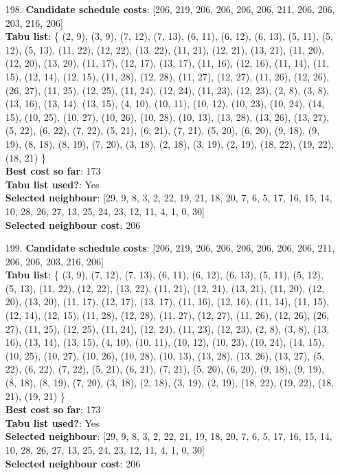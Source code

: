 \documentclass[fleqn]{article}
\begin{document}
\begin{itemize}
    \item[198.] \textbf{Candidate schedule costs}: [206, 219, 206, 206, 206, 206, 211, 206, 206, 203, 216, 206] \\
    \textbf{Tabu list}: \{ (2, 9), (3, 9), (7, 12), (7, 13), (6, 11), (6, 12), (6, 13), (5, 11), (5, 12), (5, 13), (11, 22), (12, 22), (13, 22), (11, 21), (12, 21), (13, 21), (11, 20), (12, 20), (13, 20), (11, 17), (12, 17), (13, 17), (11, 16), (12, 16), (11, 14), (11, 15), (12, 14), (12, 15), (11, 28), (12, 28), (11, 27), (12, 27), (11, 26), (12, 26), (26, 27), (11, 25), (12, 25), (11, 24), (12, 24), (11, 23), (12, 23), (2, 8), (3, 8), (13, 16), (13, 14), (13, 15), (4, 10), (10, 11), (10, 12), (10, 23), (10, 24), (14, 15), (10, 25), (10, 27), (10, 26), (10, 28), (10, 13), (13, 28), (13, 26), (13, 27), (5, 22), (6, 22), (7, 22), (5, 21), (6, 21), (7, 21), (5, 20), (6, 20), (9, 18), (9, 19), (8, 18), (8, 19), (7, 20), (3, 18), (2, 18), (3, 19), (2, 19), (18, 22), (19, 22), (18, 21) \} \\
    \textbf{Best cost so far}: 173 \\
    \textbf{Tabu list used?}: Yes \\
    \textbf{Selected neighbour}: [29, 9, 8, 3, 2, 22, 19, 21, 18, 20, 7, 6, 5, 17, 16, 15, 14, 10, 28, 26, 27, 13, 25, 24, 23, 12, 11, 4, 1, 0, 30] \\
    \textbf{Selected neighbour cost}: 206
      

    \item[199.] \textbf{Candidate schedule costs}: [206, 219, 206, 206, 206, 206, 206, 206, 211, 206, 206, 203, 216, 206] \\
    \textbf{Tabu list}: \{ (3, 9), (7, 12), (7, 13), (6, 11), (6, 12), (6, 13), (5, 11), (5, 12), (5, 13), (11, 22), (12, 22), (13, 22), (11, 21), (12, 21), (13, 21), (11, 20), (12, 20), (13, 20), (11, 17), (12, 17), (13, 17), (11, 16), (12, 16), (11, 14), (11, 15), (12, 14), (12, 15), (11, 28), (12, 28), (11, 27), (12, 27), (11, 26), (12, 26), (26, 27), (11, 25), (12, 25), (11, 24), (12, 24), (11, 23), (12, 23), (2, 8), (3, 8), (13, 16), (13, 14), (13, 15), (4, 10), (10, 11), (10, 12), (10, 23), (10, 24), (14, 15), (10, 25), (10, 27), (10, 26), (10, 28), (10, 13), (13, 28), (13, 26), (13, 27), (5, 22), (6, 22), (7, 22), (5, 21), (6, 21), (7, 21), (5, 20), (6, 20), (9, 18), (9, 19), (8, 18), (8, 19), (7, 20), (3, 18), (2, 18), (3, 19), (2, 19), (18, 22), (19, 22), (18, 21), (19, 21) \} \\
    \textbf{Best cost so far}: 173 \\
    \textbf{Tabu list used?}: Yes \\
    \textbf{Selected neighbour}: [29, 9, 8, 3, 2, 22, 21, 19, 18, 20, 7, 6, 5, 17, 16, 15, 14, 10, 28, 26, 27, 13, 25, 24, 23, 12, 11, 4, 1, 0, 30] \\
    \textbf{Selected neighbour cost}: 206
      


\end{itemize}
\end{document}

